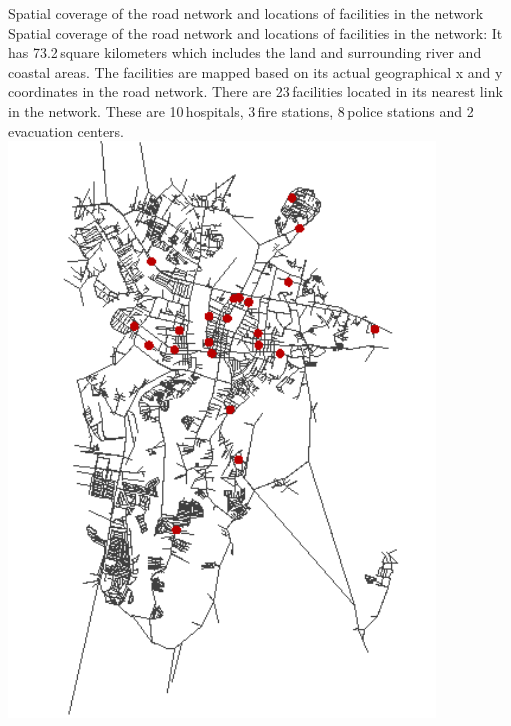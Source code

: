 \createfigure%
{Spatial coverage of the road network and locations of facilities in the network}%
{Spatial coverage of the road network and locations of facilities in the network: It has 73.2\,square kilometers which includes the land and surrounding river and coastal areas. The facilities are mapped based on its actual geographical x and y coordinates in the road network. There are 23\,facilities located in its nearest link in the network. These are 10\,hospitals, 3\,fire stations, 8\,police stations and 2\,evacuation centers.}%
{\label{fig:philippines_fig3}}%
{\includegraphics[width=0.85\textwidth, angle=0]{./using/figures/philippines_fig3.png}}%
{}

